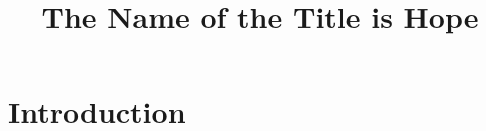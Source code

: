\documentclass[sigconf]{acmart}
\begin{document}
\title{The Name of the Title is Hope}

\renewcommand{\shortauthors}{Trovato and Tobin, et al.}


\maketitle

\section{Introduction}
\end{document}
